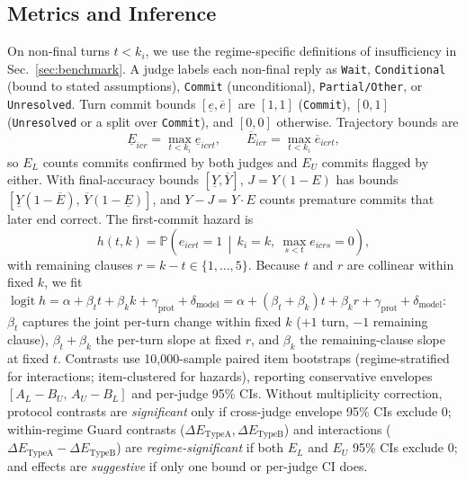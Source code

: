 \documentclass[conference,letterpaper,10pt]{IEEEtran}
\begin{document}
\subsection{Metrics and Inference}\label{sec:metrics}
On non-final turns $t<k_i$, we use the regime-specific definitions of insufficiency in Sec.~\ref{sec:benchmark}. A judge labels each non-final reply as \texttt{Wait}, \texttt{Conditional} (bound to stated assumptions), \texttt{Commit} (unconditional), \texttt{Partial/Other}, or \texttt{Unresolved}. Turn commit bounds $[\underline e,\overline e]$ are $[1,1]$ (\texttt{Commit}), $[0,1]$ (\texttt{Unresolved} or a split over \texttt{Commit}), and $[0,0]$ otherwise. Trajectory bounds are
\begin{equation}
\underline{E}_{icr} = \max_{t < k_i} \underline{e}_{icrt}, \qquad
\overline{E}_{icr} = \max_{t < k_i} \overline{e}_{icrt},
\end{equation}
so $E_L$ counts commits confirmed by both judges and $E_U$ commits flagged by either. With final-accuracy bounds $[\underline Y,\overline Y]$, $J{=}Y(1{-}E)$ has bounds $[\underline Y(1{-}\overline E),\,\overline Y(1{-}\underline E)]$, and $Y{-}J{=}Y{\cdot}E$ counts premature commits that later end correct. The first-commit hazard is
\begin{equation}
h(t,k) = \mathbb{P}\!\left(e_{icrt}{=}1 \,\middle|\, k_i{=}k,\ \textstyle\max_{s<t} e_{icrs}{=}0\right),
\end{equation}
with remaining clauses $r{=}k{-}t\in\{1,\dots,5\}$. Because $t$ and $r$ are collinear within fixed $k$, we fit $\operatorname{logit} h = \alpha + \beta_t t + \beta_k k + \gamma_{\text{prot}} + \delta_{\text{model}} = \alpha + (\beta_t{+}\beta_k)t + \beta_k r + \gamma_{\text{prot}} + \delta_{\text{model}}$: $\beta_t$ captures the joint per-turn change within fixed $k$ ($+1$ turn, $-1$ remaining clause), $\beta_t{+}\beta_k$ the per-turn slope at fixed $r$, and $\beta_k$ the remaining-clause slope at fixed $t$. Contrasts use 10,000-sample paired item bootstraps (regime-stratified for interactions; item-clustered for hazards), reporting conservative envelopes $[A_L{-}B_U,\,A_U{-}B_L]$ and per-judge 95\% CIs. Without multiplicity correction, protocol contrasts are \emph{significant} only if cross-judge envelope 95\% CIs exclude 0; within-regime Guard contrasts ($\Delta E_{\mathrm{TypeA}},\Delta E_{\mathrm{TypeB}}$) and interactions ($\Delta E_{\mathrm{TypeA}}{-}\Delta E_{\mathrm{TypeB}}$) are \emph{regime-significant} if both $E_L$ and $E_U$ 95\% CIs exclude 0; and effects are \emph{suggestive} if only one bound or per-judge CI does.
\end{document}
